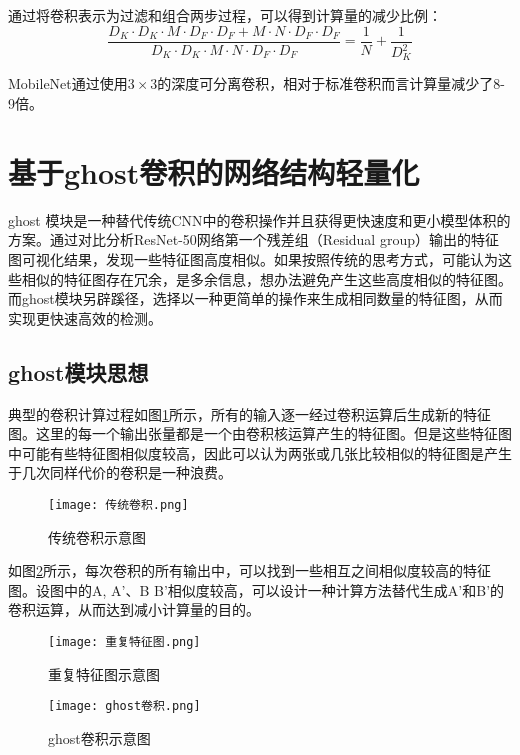 通过将卷积表示为过滤和组合两步过程，可以得到计算量的减少比例：
\begin{equation}
    \frac{D_{K} \cdot D_{K} \cdot M \cdot D_{F} \cdot D_{F}+M \cdot N \cdot D_{F} \cdot D_{F}}{D_{K} \cdot D_{K} \cdot M \cdot N \cdot D_{F} \cdot D_{F}}=\frac{1}{N}+\frac{1}{D_{K}^{2}}
\end{equation}

MobileNet通过使用$3\times3$的深度可分离卷积，相对于标准卷积而言计算量减少了8-9倍。

\section{基于ghost卷积的网络结构轻量化}
ghost 模块是一种替代传统CNN中的卷积操作并且获得更快速度和更小模型体积的方案。通过对比分析ResNet-50网络第一个残差组（Residual group）输出的特征图可视化结果，发现一些特征图高度相似。如果按照传统的思考方式，可能认为这些相似的特征图存在冗余，是多余信息，想办法避免产生这些高度相似的特征图。而ghost模块另辟蹊径，选择以一种更简单的操作来生成相同数量的特征图，从而实现更快速高效的检测。

\subsection{ghost模块思想}
典型的卷积计算过程如图\ref{conv}所示，所有的输入逐一经过卷积运算后生成新的特征图。这里的每一个输出张量都是一个由卷积核运算产生的特征图。但是这些特征图中可能有些特征图相似度较高，因此可以认为两张或几张比较相似的特征图是产生于几次同样代价的卷积是一种浪费。

\begin{figure}[htbp]
    \centering
    \texttt{[image: 传统卷积.png]}
    \caption{传统卷积示意图}
    \label{conv}
\end{figure}

如图\ref{identical}所示，每次卷积的所有输出中，可以找到一些相互之间相似度较高的特征图。设图中的A, A’、B B’相似度较高，可以设计一种计算方法替代生成A’和B’的卷积运算，从而达到减小计算量的目的。

\begin{figure}[htbp]
    \centering
    \texttt{[image: 重复特征图.png]}
    \caption{重复特征图示意图}
    \label{identical}
\end{figure}

\begin{figure}[htbp]
    \centering
    \texttt{[image: ghost卷积.png]}
    \caption{ghost卷积示意图}
    \label{ghost1}
\end{figure}

